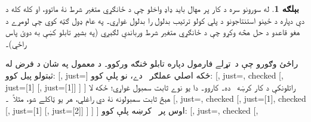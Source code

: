\documentclass[12pt,a4paper,oneside]{report}
\newcommand{\olfileid}[3]{\gdef\pspart{#1}\gdef\pschapter{#2}\gdef\pssection{#3}}
\gdef\pspart{#2}\gdef\pschapter{#3}\gdef\pssection{}%
\newenvironment{oltableau}
  {\center\LTR\tableau{}}
  {\endtableau\endLTR\endcenter}
\theoremstyle{definition}
\newtheorem{ex}[thm]{بېلګه}
\begin{document}
\label{olpseg:OLP-0104-B004:start}
\olfileid{fol}{tab}{prq}
\label{olpseg:OLP-0104-B004:end}

\label{olpseg:OLP-0104-B005:start}
\label{olpseg:OLP-0104-B005:end}

\label{olpseg:OLP-0104-B006:start}
\begin{ex}
له سورونو سره د کار پر مهال بايد ډاډ واخلو چې د ځانګړي متغير
شرط نۀ ماتوو، او کله کله د دې دپاره د ځينو استنتاجونو د پلي کولو
ترتيب بدلول را بدلول غواړي۔ په عام ډول ګټه کوي چې لومړے د هغو
قاعدو د حل هڅه وکړو چې د ځانګړي متغير شرط ورباندې لګېږي (په بشپړ
تابلو کښې به دوئ پاس راځي)۔
\label{olpseg:OLP-0104-B006:end}

\label{olpseg:OLP-0104-B007:start}
راځئ وګورو چې د~تړلے فارمول
\LR{$\lexists[x][\lnot !A(x)] \lif \lnot \lforall[x][!A(x)]$}
دپاره تابلو څنګه ورکوو۔ د معمول په شان د فرض له ثبتولو
پيل کوو:
\begin{oltableau}
[, just=\TAss]
\end{oltableau}
ځکه اصلي عملګر~\LR{$\lif$} دے، نو
\LR{$\TRule{\False}{\lif}$} پلې کوو:
\begin{oltableau}
[, just=\TAss, checked
  [,
    just={\TRule{\False}{\lif}[1]}
    [\sFmla{\False}{\lnot\lforall[x][\formula{A}(x)]},
      just={\TRule{\False}{\lif}[1]}]
  ]
]
\end{oltableau}
راتلونکې د کار کرښه~ ده۔ \LR{$\TRule{\True}{\lexists}$} کاروو۔
دا يو نوے ثابت سمبول غواړي؛ ځکه لا هېڅ ثابت سمبولونه نۀ دي
راغلي، هر يو ټاکلے شو، مثلاً~۔
\begin{oltableau}
[, just=\TAss, checked
  [,
    just={\TRule{\False}{\lif}[1]}, checked
    [\sFmla{\False}{\lnot\lforall[x][\formula{A}(x)]},
      just={\TRule{\False}{\lif}[1]}
      [, just={\TRule{\True}{\lexists}[2]}]
    ]
  ]
]
\end{oltableau}
اوس پر~ کرښه \LR{$\TRule{\False}{\lnot}$} پلې کوو:
\begin{oltableau}
[, just=\TAss, checked
  [,

\end{oltableau}
\end{ex}
\end{document}

